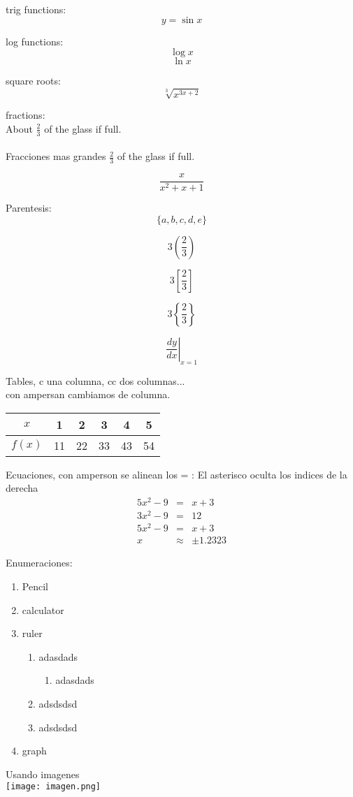 \documentclass[12pt]{article}
\begin{document}
trig functions:
$$y=\sin{x}$$

log functions:
$$\log{x}$$
$$\ln{x}$$

square roots:
$$\sqrt[3]{x^{3x+2}}$$

fractions:\\
About $\frac{2}{3}$ of the glass if full.\\
\\
Fracciones mas grandes $\displaystyle{\frac{2}{3}}$ of the glass if full.

$$\frac{x}{x^2+x+1}$$

Parentesis:
$$\{a,b,c,d,e\}$$

$$3\left(\frac{2}{3}\right)$$

$$3\left[\frac{2}{3}\right]$$

$$3\left\{\frac{2}{3}\right\}$$

$$\left. \frac{dy}{dx} \right|_{x=1}$$

Tables, c una columna, cc dos columnas...\\
con ampersan cambiamos de columna.\\

\begin{tabular}{|c|ccccc|}
\hline
$x$  & 1 & 2 & 3 & 4 & 5 \\ \hline
$f(x)$  & 11 & 22 & 33 & 43 & 54 \\ \hline
\end{tabular}


Ecuaciones, con amperson se alinean los = :
El asterisco oculta los indices de la derecha
\begin{eqnarray*}
5x^2-9 &=& x + 3 \\
3x^2-9 &=& 12 \\
5x^2-9 &=& x + 3\\
x&\approx&\pm1.2323
\end{eqnarray*}


Enumeraciones:
\begin{enumerate}
\item Pencil
\item calculator
\item ruler
	\begin{enumerate}
	\item adasdads
	\begin{enumerate}
	\item adasdads
	\end{enumerate}
	\item adsdsdsd
	\item adsdsdsd
	\end{enumerate}
\item graph
\end{enumerate}

Usando imagenes
\\
\texttt{[image: imagen.png]}
\end{document}
